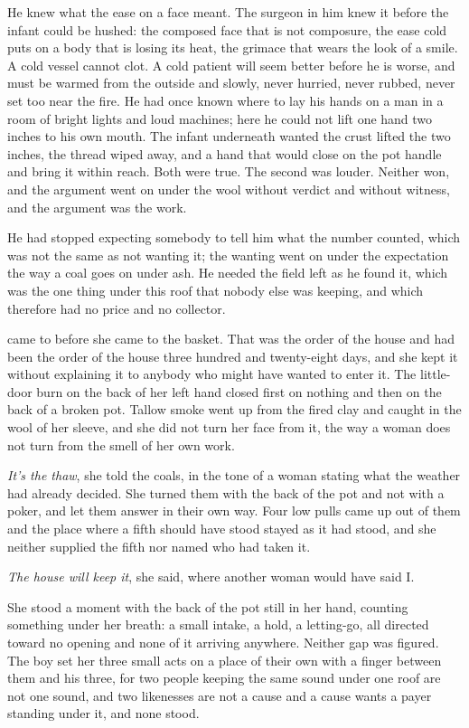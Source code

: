 He knew what the ease on a face meant. The surgeon in him knew it before the infant could be hushed: the composed face that is not composure, the ease cold puts on a body that is losing its heat, the grimace that wears the look of a smile. A cold vessel cannot clot. A cold patient will seem better before he is worse, and must be warmed from the outside and slowly, never hurried, never rubbed, never set too near the fire. He had once known where to lay his hands on a man in a room of bright lights and loud machines; here he could not lift one hand two inches to his own mouth. The infant underneath wanted the crust lifted the two inches, the thread wiped away, and a hand that would close on the pot handle and bring it within reach. Both were true. The second was louder. Neither won, and the argument went on under the wool without verdict and without witness, and the argument was the work.

He had stopped expecting somebody to tell him what the number counted, which was not the same as not wanting it; the wanting went on under the expectation the way a coal goes on under ash. He needed the field left as he found it, which was the one thing under this roof that nobody else was keeping, and which therefore had no price and no collector.

\scenebreak

 came to  before she came to the basket. That was the order of the house and had been the order of the house three hundred and twenty-eight days, and she kept it without explaining it to anybody who might have wanted to enter it. The little-door burn on the back of her left hand closed first on nothing and then on the back of a broken pot. Tallow smoke went up from the fired clay and caught in the wool of her sleeve, and she did not turn her face from it, the way a woman does not turn from the smell of her own work.

\emph{It's the thaw}, she told the coals, in the tone of a woman stating what the weather had already decided. She turned them with the back of the pot and not with a poker, and let them answer in their own way. Four low pulls came up out of them and the place where a fifth should have stood stayed as it had stood, and she neither supplied the fifth nor named who had taken it.

\emph{The house will keep it}, she said, where another woman would have said I.

She stood a moment with the back of the pot still in her hand, counting something under her breath: a small intake, a hold, a letting-go, all directed toward no opening and none of it arriving anywhere. Neither gap was figured. The boy set her three small acts on a place of their own with a finger between them and his three, for two people keeping the same sound under one roof are not one sound, and two likenesses are not a cause and a cause wants a payer standing under it, and none stood.

